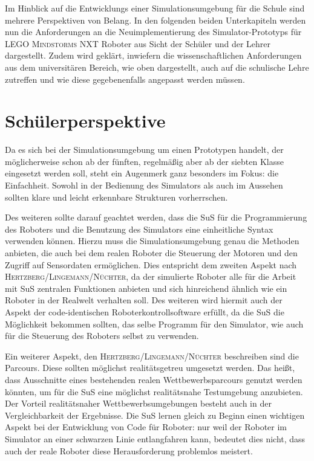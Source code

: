 \documentclass[paper=a4, DIV=calc, BCOR=15mm, twoside=on, onecolumn=on, open = right, titlepage =on, parskip =half, headsepline = on, footsepline = on, chapterprefix = off, appendixprefix = off, fontsize = 12pt, numbers = noenddot, abstract = on]{scrbook}
\begin{document}
Im Hinblick auf die Entwicklungs einer Simulationsumgebung für die Schule sind mehrere Perspektiven von Belang. 
In den folgenden beiden Unterkapiteln werden nun die Anforderungen an die Neuimplementierung des Simulator-Prototyps für \textsc{LEGO Mindstorms} NXT Roboter aus Sicht der Schüler und der Lehrer dargestellt. Zudem wird geklärt, inwiefern die wissenschaftlichen Anforderungen aus dem universitären Bereich, wie oben dargestellt, auch auf die schulische Lehre zutreffen und wie diese gegebenenfalls angepasst werden müssen.

\par \singlespacing
\section{Schülerperspektive}
\label{sec:schüler}
\onehalfspacing

Da es sich bei der Simulationsumgebung um einen Prototypen handelt, der möglicherweise schon ab der fünften, regelmäßig aber ab der siebten Klasse eingesetzt werden soll, steht ein Augenmerk ganz besonders im Fokus: die Einfachheit. Sowohl in der Bedienung des Simulators als auch im Aussehen sollten klare und leicht erkennbare Strukturen vorherrschen.

Des weiteren sollte darauf geachtet werden, dass die SuS für die Programmierung des Roboters und die Benutzung des Simulators eine einheitliche Syntax verwenden können. Hierzu muss die Simulationsumgebung genau die Methoden anbieten, die auch bei dem realen Roboter die Steuerung der Motoren und den Zugriff auf Sensordaten ermöglichen. Dies entspricht dem zweiten Aspekt nach \textsc{Hertz\-berg\-/\-Lin\-ge\-mann\-/Nüch\-ter}, da der simulierte Roboter alle für die Arbeit mit SuS zentralen Funktionen anbieten und sich hinreichend ähnlich wie ein Roboter in der Realwelt verhalten soll. Des weiteren wird hiermit auch der Aspekt der code-identischen Roboterkontrollsoftware erfüllt, da die SuS die Möglichkeit bekommen sollten, das selbe Programm für den Simulator, wie auch für die Steuerung des Roboters selbst zu verwenden.

Ein weiterer Aspekt, den \textsc{Hertz\-berg\-/\-Lin\-ge\-mann\-/Nüch\-ter} beschreiben sind die Parcours. Diese sollten möglichst realitätsgetreu umgesetzt werden. Das heißt, dass Ausschnitte eines bestehenden realen Wettbewerbsparcours genutzt werden könnten, um für die SuS eine möglichst realitätsnahe Testumgebung anzubieten. Der Vorteil realitätsnaher Wettbewerbsumgebungen besteht auch in der Vergleichbarkeit der Ergebnisse. Die SuS lernen gleich zu Beginn einen wichtigen Aspekt bei der Entwicklung von Code für Roboter: nur weil der Roboter im Simulator an einer schwarzen Linie entlangfahren kann, bedeutet dies nicht, dass auch der reale Roboter diese Herausforderung problemlos meistert.
\end{document}
